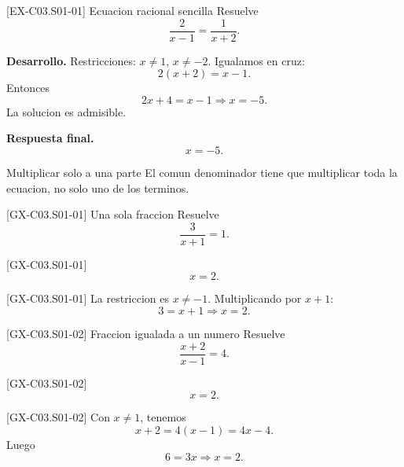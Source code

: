 \begin{solvedexample}{[EX-C03.S01-01] Ecuacion racional sencilla}
Resuelve
\[
\frac{2}{x-1}=\frac{1}{x+2}.
\]

\textbf{Desarrollo.} Restricciones: \(x\neq 1\), \(x\neq -2\). Igualamos en cruz:
\[
2(x+2)=x-1.
\]
Entonces
\[
2x+4=x-1 \Longrightarrow x=-5.
\]
La solucion es admisible.

\textbf{Respuesta final.}
\[
x=-5.
\]
\end{solvedexample}

\begin{commonerror}{Multiplicar solo a una parte}
El comun denominador tiene que multiplicar toda la ecuacion, no solo uno de los terminos.
\end{commonerror}

\begin{guidedexercise}{[GX-C03.S01-01] Una sola fraccion}
Resuelve
\[
\frac{3}{x+1}=1.
\]
\end{guidedexercise}

\begin{shortanswer}{[GX-C03.S01-01]}
\[
x=2.
\]
\end{shortanswer}

\begin{fullsolution}{[GX-C03.S01-01]}
La restriccion es \(x\neq -1\). Multiplicando por \(x+1\):
\[
3=x+1 \Longrightarrow x=2.
\]
\end{fullsolution}

\begin{guidedexercise}{[GX-C03.S01-02] Fraccion igualada a un numero}
Resuelve
\[
\frac{x+2}{x-1}=4.
\]
\end{guidedexercise}

\begin{shortanswer}{[GX-C03.S01-02]}
\[
x=2.
\]
\end{shortanswer}

\begin{fullsolution}{[GX-C03.S01-02]}
Con \(x\neq 1\), tenemos
\[
x+2=4(x-1)=4x-4.
\]
Luego
\[
6=3x \Longrightarrow x=2.
\]
\end{fullsolution}

